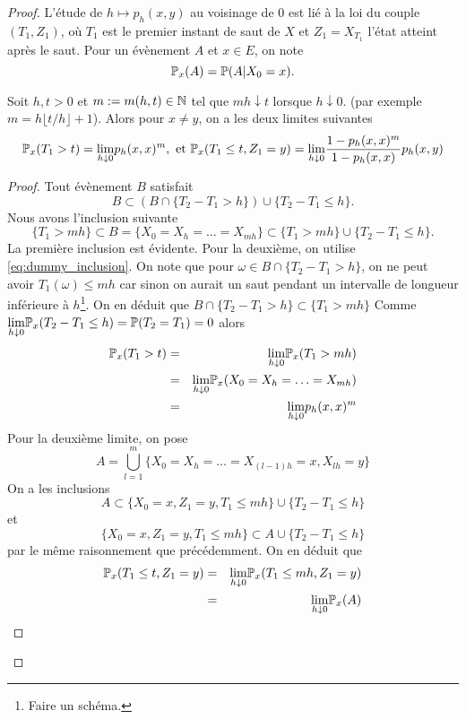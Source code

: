 \begin{proof}
L'étude de $h\mapsto p_h(x,y)$ au voisinage de $0$ est lié à la loi du couple $(T_1, Z_1)$, où $T_1$ est le premier instant de saut de $X$ et $Z_1 = X_{T_1}$ l'état atteint après le saut. Pour un évènement $A$ et $x\in E$, on note 
$$
\mathbb{P}_x(A) = \mathbb{P}(A|X_0  = x).
$$
\begin{lemma}\label{lem:T_Z}
Soit $h,t>0$ et $m:=m(h,t)\in \mathbb{N}$ tel que $mh\downarrow t$ lorsque $h\downarrow0$. (par exemple $m = h\lfloor t/h\rfloor+1$). Alors pour $x\neq y$, on a les deux limites suivantes
$$
\mathbb{P}_x( T_1>t) = \underset{h\downarrow 0}{\lim} p_h(x,x)^m
,\text{ et }\mathbb{P}_x(T_1\leq t, Z_1 = y) = \underset{h\downarrow0}{\lim}\frac{1-p_h(x,x)^m}{1-p_h(x,x)}p_h(x,y)
$$
\end{lemma}
\begin{proof}
Tout évènement $B$ satisfait 
\begin{equation}\label{eq:dummy_inclusion}
B\subset(B\cap\{T_2-T_1 > h\})\cup\{T_2 - T_1 \leq h\}.
\end{equation}
Nous avons l'inclusion suivante 
$$
\{T_1 >mh\}\subset B = \{X_0 = X_{h} = \ldots= X_{mh}\}\subset\{T_1>mh\}\cup \{T_2 - T_1\leq h\}.
$$
La première inclusion est évidente. Pour la deuxième, on utilise \eqref{eq:dummy_inclusion}. On note que pour $\omega\in B\cap\{T_2-T_1 > h\}$, on ne peut avoir $T_1(\omega)\leq mh$ car sinon on aurait un saut pendant un intervalle de longueur inférieure à $h$\footnote{Faire un schéma.}. On en déduit que $B\cap\{T_2-T_1>h\}\subset\{T_1 > mh\}$ Comme $\underset{h\downarrow 0}{\lim}\mathbb{P}_x(T_2 - T_1\leq h) = \mathbb{P}(T_2 = T_1) = 0$ alors 
\begin{eqnarray*}
\mathbb{P}_x(T_1>t) &=&\underset{h\downarrow 0}{\lim}\mathbb{P}_x(T_1>mh)\\
&=&\underset{h\downarrow 0}{\lim}\mathbb{P}_x(X_0 = X_h = \ldots = X_{mh})\\
&=&\underset{h\downarrow 0}{\lim}p_h(x,x)^m\\
\end{eqnarray*}
Pour la deuxième limite, on pose 
$$
A = \bigcup_{l = 1}^m\{X_0 = X_h = \ldots= X_{(l-1)h} = x,X_{lh}=y\}
$$ 
On a les inclusions
$$
A\subset\{X_0 = x,Z_1 = y, T_1\leq mh\}\cup\{T_2-T_1 \le h\}
$$
et
$$
\{X_0 = x,Z_1 = y, T_1\leq mh\}\subset A\cup\{T_2-T_1 \le h\}
$$ 
par le même raisonnement que précédemment. On en déduit que 
\begin{eqnarray*}
\Prob_x(T_1\leq t, Z_1 = y)&=&\underset{h\downarrow 0}{\lim} \Prob_x(T_1\leq mh, Z_1 = y)\\
&=&\underset{h\downarrow 0}{\lim} \Prob_x(A)\\

\end{eqnarray*}
\end{proof}
\end{proof}
